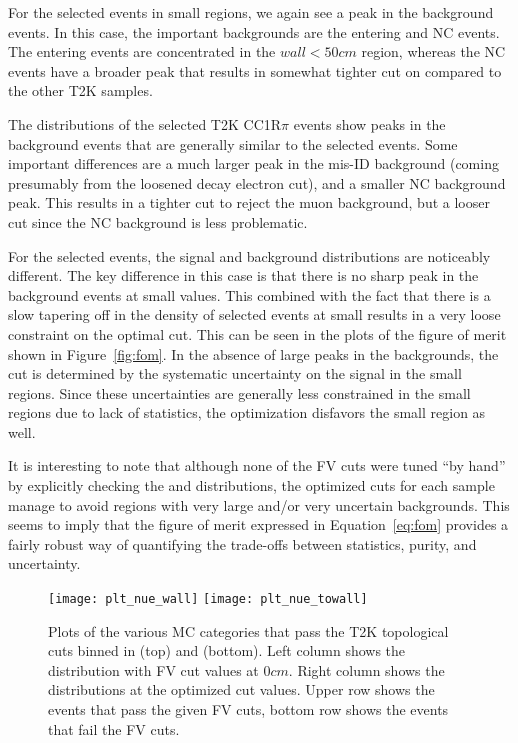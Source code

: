For the selected \nue events in small \wall regions, we again see a peak in the
background events.  In this case, the important backgrounds are the entering and
NC events. The entering events are concentrated in the $wall < 50 cm$ region,
whereas the NC events have a broader peak that results in somewhat tighter cut
on \wall compared to the other T2K samples.

The distributions of the selected T2K \nue CC1R$\pi$ events show peaks in the
background events that are generally similar to the selected \nue events.  Some
important differences are a much larger peak in the mis-ID background (coming
presumably from the loosened decay electron cut), and a smaller NC background
peak.  This results in a tighter \towall cut to reject the muon background, but
a looser \wall cut since the NC background is less problematic.

For the selected \numu events, the signal and background distributions are
noticeably different.  The key difference in this case is that there is no
sharp peak in the background events at small \towall values.  This combined
with the fact that there is a slow tapering off in the density of selected
\numu events at small \towall results in a very loose constraint on the optimal
\towall cut.  This can be seen in the plots of the figure of merit shown in
Figure~\ref{fig:fom}.  In the absence of large peaks in the backgrounds, the
\numu \towall cut is determined by the systematic uncertainty on the signal in
the small \towall regions.  Since these uncertainties are generally less
constrained in the small \towall regions due to lack of statistics, the optimization disfavors
the small \towall region as well.

It is interesting to note that although none of the FV cuts were
tuned ``by hand'' by explicitly checking the \towall and \wall
distributions, the optimized cuts for each sample manage to avoid regions with very
large and/or very uncertain backgrounds.  This seems to imply that the figure
of merit expressed in Equation~\ref{eq:fom} provides a fairly robust way of
quantifying the trade-offs between statistics, purity, and uncertainty.


\begin{figure}[h]
  \begin{center}
    \texttt{[image: plt\_nue\_wall]}
    \texttt{[image: plt\_nue\_towall]}
  \end{center}
  \caption{Plots of the various MC categories that pass the T2K \nue
  topological cuts binned in \wall (top) and \towall (bottom).  Left
  column shows the distribution with FV cut values at $0 cm$.  Right column
  shows the distributions at the optimized cut values. Upper row shows the
  events that pass the given FV cuts, bottom row shows the events that fail the
  FV cuts. 
  }
  \label{fig:nuetowall}
\end{figure}


